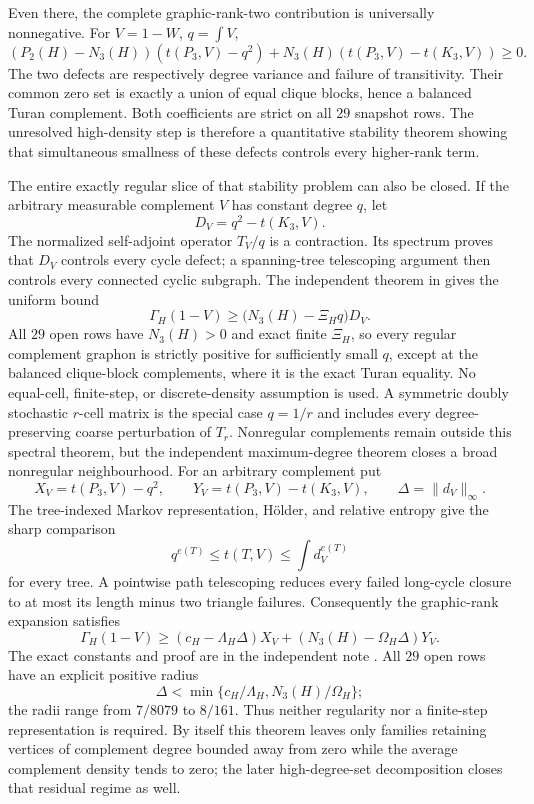 \documentclass[11pt]{article}
\begin{document}
Even there, the complete graphic-rank-two contribution is universally
nonnegative.  For $V=1-W$, $q=\int V$,
\[
 (P_2(H)-N_3(H))(t(P_3,V)-q^2)
 +N_3(H)(t(P_3,V)-t(K_3,V))\geq0.
\]
The two defects are respectively degree variance and failure of transitivity.
Their common zero set is exactly a union of equal clique blocks, hence a
balanced Turan complement.  Both coefficients are strict on all $29$
snapshot rows.  The unresolved high-density step is therefore a quantitative
stability theorem showing that simultaneous smallness of these defects
controls every higher-rank term.

The entire exactly regular slice of that stability problem can also be
closed.  If the arbitrary measurable complement $V$ has constant degree
$q$, let
\[
 D_V=q^2-t(K_3,V).
\]
The normalized self-adjoint operator $T_V/q$ is a contraction.  Its spectrum
proves that $D_V$ controls every cycle defect; a spanning-tree telescoping
argument then controls every connected cyclic subgraph.  The independent
theorem in  gives
the uniform bound
\[
 \Gamma_H(1-V)\geq\bigl(N_3(H)-\Xi_Hq\bigr)D_V.
\]
All $29$ open rows have $N_3(H)>0$ and exact finite $\Xi_H$, so every regular
complement graphon is strictly positive for sufficiently small $q$, except
at the balanced clique-block complements, where it is the exact Turan
equality.  No equal-cell, finite-step, or discrete-density assumption is
used.  A symmetric doubly stochastic $r$-cell matrix is the special case
$q=1/r$ and includes every degree-preserving coarse perturbation of $T_r$.
Nonregular complements remain outside this spectral theorem, but the
independent maximum-degree theorem closes a broad nonregular neighbourhood.
For an arbitrary complement put
\[
 X_V=t(P_3,V)-q^2,
 \qquad Y_V=t(P_3,V)-t(K_3,V),
 \qquad \Delta=\lVert d_V\rVert_\infty.
\]
The tree-indexed Markov representation, H\"older, and relative entropy give
the sharp comparison
\[
 q^{e(T)}\leq t(T,V)\leq\int d_V^{e(T)}
\]
for every tree.  A pointwise path telescoping reduces every failed long-cycle
closure to at most its length minus two triangle failures.  Consequently the
graphic-rank expansion satisfies
\[
 \Gamma_H(1-V)\geq
 (c_H-\Lambda_H\Delta)X_V
 +(N_3(H)-\Omega_H\Delta)Y_V.
\]
The exact constants and proof are in the independent note
{\small{}}.
All $29$ open rows have an explicit positive radius
\[
 \Delta<\min\{c_H/\Lambda_H,N_3(H)/\Omega_H\};
\]
the radii range from $7/8079$ to $8/161$.  Thus neither regularity nor a
finite-step representation is required.  By itself this theorem leaves only
families retaining vertices of complement degree bounded away from zero while
the average complement density tends to zero; the later high-degree-set
decomposition closes that residual regime as well.
\end{document}
